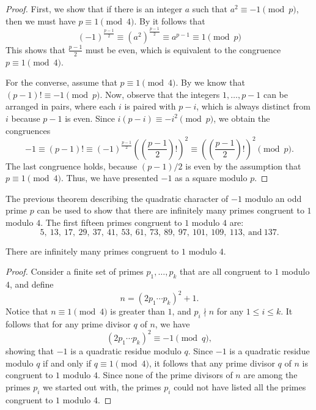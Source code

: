 \begin{proof}
  First, we show that if there is an integer $a$ such that $a^2\equiv-1\pmod{p}$, then we must have $p\equiv 1\pmod{4}$. By  it follows that
  \begin{equation*}
    (-1)^{\frac{p-1}{2}}\equiv (a^2)^{\frac{p-1}{2}} \equiv a^{p-1}\equiv 1\pmod{p}
  \end{equation*}
  This shows that $\frac{p-1}{2}$ must be even, which is equivalent to the congruence $p\equiv 1\pmod{4}$.
  
  For the converse, assume that $p\equiv 1\pmod{4}$. By  we know that $(p-1)!\equiv -1\pmod{p}$. Now, observe that the integers $1,\ldots,p-1$ can be arranged in pairs, where each $i$ is paired with $p-i$, which is always distinct from $i$ because $p-1$ is even. Since $i(p-i)\equiv -i^2\pmod{p}$, we obtain the congruences
  \begin{equation*}
    -1\equiv(p-1)!\equiv (-1)^{\frac{p-1}{2}}\left(\left(\frac{p-1}{2}\right)!\right)^2\equiv\left(\left(\frac{p-1}{2}\right)!\right)^2\pmod{p}.
  \end{equation*}
  The last congruence holds, because $(p-1)/2$ is even by the assumption that $p\equiv 1\pmod{4}$. Thus, we have presented $-1$ as a square modulo $p$.
\end{proof}

The previous theorem describing the quadratic character of $-1$ modulo an odd prime $p$ can be used to show that there are infinitely many primes congruent to $1$ modulo $4$. The first fifteen primes congruent to $1$ modulo $4$ are:
\begin{equation*}
  5,~13,~17,~29,~37,~41,~53,~61,~73,~89,~97,~101,~109,~113,~\text{and}~137.
\end{equation*}

\begin{theorem}
  There are infinitely many primes congruent to $1$ modulo $4$.
\end{theorem}

\begin{proof}
  Consider a finite set of primes $p_1,\ldots,p_k$ that are all congruent to $1$ modulo $4$, and define
  \begin{equation*}
    n = (2p_1\cdots p_k)^2 + 1.
  \end{equation*}
  Notice that $n\equiv 1\pmod{4}$ is greater than $1$, and $p_i\nmid n$ for any $1\leq i\leq k$. It follows that for any prime divisor $q$ of $n$, we have
  \begin{equation*}
    (2p_1\cdots p_k)^2\equiv -1\pmod{q},
  \end{equation*}
  showing that $-1$ is a quadratic residue modulo $q$. Since $-1$ is a quadratic residue modulo $q$ if and only if $q\equiv 1\pmod{4}$, it follows that any prime divisor $q$ of $n$ is congruent to $1$ modulo $4$. Since none of the prime divisors of $n$ are among the primes $p_i$ we started out with, the primes $p_i$ could not have listed all the primes congruent to $1$ modulo $4$.
\end{proof}

